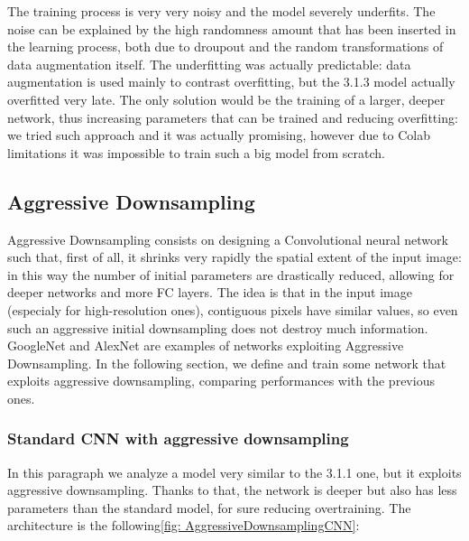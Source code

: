 \medskip

\noindent The training process is very very noisy and the model severely underfits. The noise can be explained by the high randomness amount that has been inserted in the learning process, both due to droupout and the random transformations of data augmentation itself.
The underfitting was actually predictable: data augmentation is used mainly to contrast overfitting, but the 3.1.3 model actually overfitted very late.
The only solution would be the training of a larger, deeper network, thus increasing parameters that can be trained and reducing overfitting: we tried such approach and it was actually promising, however due to Colab limitations it was impossible to train such a big model from scratch.


\subsection{Aggressive Downsampling}
Aggressive Downsampling consists on designing a Convolutional neural network such that, first of all, it shrinks very rapidly the spatial extent of the input image: in this way the number of initial parameters are drastically reduced, allowing for deeper networks and more FC layers. The idea is that in the input image (especialy for high-resolution ones), contiguous pixels have similar values, so even such an aggressive initial downsampling does not destroy much information. GoogleNet and AlexNet are examples of networks exploiting Aggressive Downsampling. In the following section, we define and train some network that exploits aggressive downsampling, comparing performances with the previous ones.

\subsubsection{Standard CNN with aggressive downsampling}
In this paragraph we analyze a model very similar to the 3.1.1 one, but it exploits aggressive downsampling. Thanks to that, the network is deeper but also has less parameters than the standard model, for sure reducing overtraining.
The architecture is the following\ref{fig: AggressiveDownsamplingCNN}:

